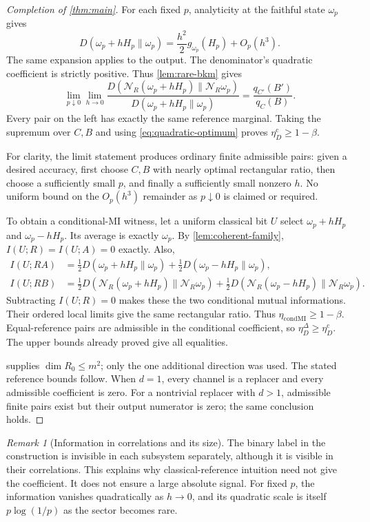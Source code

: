\documentclass[11pt]{article}
\numberwithin{equation}{section}
\theoremstyle{definition}
\theoremstyle{remark}
\newtheorem{remark}[theorem]{Remark}
\newcommand{\N}{\mathcal N}
\newcommand{\etaC}{\eta_D^{\mathrm c}}
\newcommand{\etaDel}{\eta_D^{\Delta}}
\newcommand{\etaCM}{\eta_{\mathrm{condMI}}}
\begin{document}
\begin{proof}[Completion of \cref{thm:main}]
For each fixed $p$, analyticity at the faithful state $\omega_p$ gives
\[
 D(\omega_p+hH_p\|\omega_p)
       =\frac{h^2}{2}g_{\omega_p}(H_p)+O_p(h^3).
\]
The same expansion applies to the output. The denominator's quadratic
coefficient is strictly positive. Thus \cref{lem:rare-bkm} gives
\begin{equation}
 \lim_{p\downarrow0}\lim_{h\to0}
 \frac{D(\N_R(\omega_p+hH_p)\|\N_R\omega_p)}
      {D(\omega_p+hH_p\|\omega_p)}
       =\frac{q_{C'}(B')}{q_C(B)}.
 \label{eq:ordered-entropy-limit}
\end{equation}
Every pair on the left has exactly the same reference marginal.
Taking the supremum over $C,B$ and using
\eqref{eq:quadratic-optimum} proves
$\etaC\geq1-\beta$.

For clarity, the limit statement produces ordinary finite admissible
pairs: given a desired accuracy, first choose $C,B$ with nearly optimal
rectangular ratio, then choose a sufficiently small $p$, and finally a
sufficiently small nonzero $h$. No uniform bound on the $O_p(h^3)$
remainder as $p\downarrow0$ is claimed or required.

To obtain a conditional-MI witness, let a uniform classical bit $U$
select $\omega_p+hH_p$ and $\omega_p-hH_p$. Its average is
exactly $\omega_p$. By \cref{lem:coherent-family},
$I(U;R)=I(U;A)=0$ exactly. Also,
\begin{align*}
 I(U;RA)
 &=\tfrac12D(\omega_p+hH_p\|\omega_p)
   +\tfrac12D(\omega_p-hH_p\|\omega_p),\\
 I(U;RB)
 &=\tfrac12D(\N_R(\omega_p+hH_p)\|\N_R\omega_p)
   +\tfrac12D(\N_R(\omega_p-hH_p)\|\N_R\omega_p).
\end{align*}
Subtracting $I(U;R)=0$ makes these the two conditional mutual
informations. Their ordered local limits give the same rectangular
ratio. Thus $\etaCM\geq1-\beta$.
Equal-reference pairs are admissible in the conditional coefficient, so
$\etaDel\geq\etaC$. The upper bounds already proved give all equalities.

 supplies $\dim R_0\leq m^2$; only the one
additional direction was used. The stated reference bounds follow.
When $d=1$, every channel is a replacer and every admissible coefficient
is zero. For a nontrivial replacer with $d>1$, admissible finite pairs
exist but their output numerator is zero; the same conclusion holds.
\end{proof}

\begin{remark}[Information in correlations and its size]
The binary label in the construction is invisible in each subsystem
separately, although it is visible in their correlations. This explains why
classical-reference intuition need not give the coefficient. It does not
ensure a large absolute signal. For fixed $p$, the information vanishes
quadratically as $h\to0$, and its quadratic scale is itself
$p\log(1/p)$ as the sector becomes rare.
\end{remark}
\end{document}
